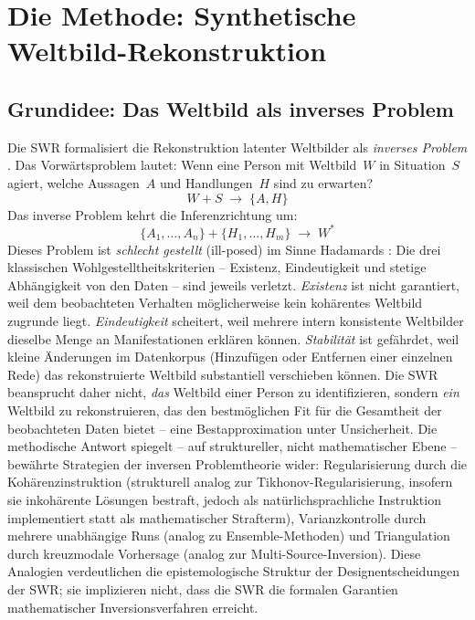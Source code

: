 \documentclass[11pt,a4paper]{article}
\theoremstyle{definition}
\theoremstyle{plain}
\theoremstyle{remark}
\begin{document}

\section{Die Methode: Synthetische Weltbild-Rekonstruktion}
\label{sec:methode}

\subsection{Grundidee: Das Weltbild als inverses Problem}
\label{sec:inversion}

Die SWR formalisiert die Rekonstruktion latenter Weltbilder als \emph{inverses Problem} \citep{Tarantola2005}. Das Vorw\"artsproblem lautet: Wenn eine Person mit Weltbild~$W$ in Situation~$S$ agiert, welche Aussagen~$A$ und Handlungen~$H$ sind zu erwarten?
%
\begin{equation}
  W + S \;\longrightarrow\; \{A, H\}
  \label{eq:forward}
\end{equation}
%
Das inverse Problem kehrt die Inferenzrichtung um:
%
\begin{equation}
  \{A_1, \ldots, A_n\} + \{H_1, \ldots, H_m\} \;\longrightarrow\; W^*
  \label{eq:inverse}
\end{equation}
%
Dieses Problem ist \emph{schlecht gestellt} (ill-posed) im Sinne Hadamards \citep{Hadamard1923}: Die drei klassischen Wohlgestelltheitskriterien -- Existenz, Eindeutigkeit und stetige Abh\"angigkeit von den Daten -- sind jeweils verletzt. \emph{Existenz} ist nicht garantiert, weil dem beobachteten Verhalten m\"oglicherweise kein koh\"arentes Weltbild zugrunde liegt. \emph{Eindeutigkeit} scheitert, weil mehrere intern konsistente Weltbilder dieselbe Menge an Manifestationen erkl\"aren k\"onnen. \emph{Stabilit\"at} ist gef\"ahrdet, weil kleine \"Anderungen im Datenkorpus (Hinzuf\"ugen oder Entfernen einer einzelnen Rede) das rekonstruierte Weltbild substantiell verschieben k\"onnen. Die SWR beansprucht daher nicht, \emph{das} Weltbild einer Person zu identifizieren, sondern \emph{ein} Weltbild zu rekonstruieren, das den bestm\"oglichen Fit f\"ur die Gesamtheit der beobachteten Daten bietet -- eine Bestapproximation unter Unsicherheit. Die methodische Antwort spiegelt -- auf struktureller, nicht mathematischer Ebene -- bew\"ahrte Strategien der inversen Problemtheorie wider: Regularisierung durch die Koh\"arenzinstruktion (strukturell analog zur Tikhonov-Regularisierung, insofern sie inkoh\"arente L\"osungen bestraft, jedoch als nat\"urlichsprachliche Instruktion implementiert statt als mathematischer Strafterm), Varianzkontrolle durch mehrere unabh\"angige Runs (analog zu Ensemble-Methoden) und Triangulation durch kreuzmodale Vorhersage (analog zur Multi-Source-Inversion). Diese Analogien verdeutlichen die epistemologische Struktur der Designentscheidungen der SWR; sie implizieren nicht, dass die SWR die formalen Garantien mathematischer Inversionsverfahren erreicht.
\end{document}
